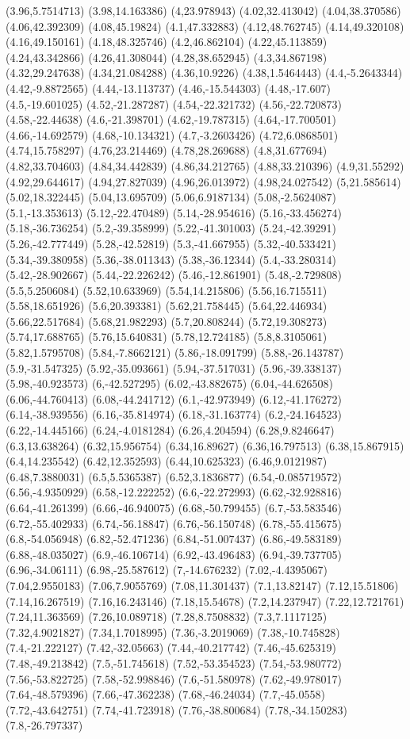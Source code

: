 (3.96,5.7514713) (3.98,14.163386) (4,23.978943) (4.02,32.413042) (4.04,38.370586) (4.06,42.392309) (4.08,45.19824) (4.1,47.332883) (4.12,48.762745) (4.14,49.320108) (4.16,49.150161) (4.18,48.325746) (4.2,46.862104) (4.22,45.113859) (4.24,43.342866) (4.26,41.308044) (4.28,38.652945) (4.3,34.867198) (4.32,29.247638) (4.34,21.084288) (4.36,10.9226) (4.38,1.5464443) (4.4,-5.2643344) (4.42,-9.8872565) (4.44,-13.113737) (4.46,-15.544303) (4.48,-17.607) (4.5,-19.601025) (4.52,-21.287287) (4.54,-22.321732) (4.56,-22.720873) (4.58,-22.44638) (4.6,-21.398701) (4.62,-19.787315) (4.64,-17.700501) (4.66,-14.692579) (4.68,-10.134321) (4.7,-3.2603426) (4.72,6.0868501) (4.74,15.758297) (4.76,23.214469) (4.78,28.269688) (4.8,31.677694) (4.82,33.704603) (4.84,34.442839) (4.86,34.212765) (4.88,33.210396) (4.9,31.55292) (4.92,29.644617) (4.94,27.827039) (4.96,26.013972) (4.98,24.027542) (5,21.585614) (5.02,18.322445) (5.04,13.695709) (5.06,6.9187134) (5.08,-2.5624087) (5.1,-13.353613) (5.12,-22.470489) (5.14,-28.954616) (5.16,-33.456274) (5.18,-36.736254) (5.2,-39.358999) (5.22,-41.301003) (5.24,-42.39291) (5.26,-42.777449) (5.28,-42.52819) (5.3,-41.667955) (5.32,-40.533421) (5.34,-39.380958) (5.36,-38.011343) (5.38,-36.12344) (5.4,-33.280314) (5.42,-28.902667) (5.44,-22.226242) (5.46,-12.861901) (5.48,-2.729808) (5.5,5.2506084) (5.52,10.633969) (5.54,14.215806) (5.56,16.715511) (5.58,18.651926) (5.6,20.393381) (5.62,21.758445) (5.64,22.446934) (5.66,22.517684) (5.68,21.982293) (5.7,20.808244) (5.72,19.308273) (5.74,17.688765) (5.76,15.640831) (5.78,12.724185) (5.8,8.3105061) (5.82,1.5795708) (5.84,-7.8662121) (5.86,-18.091799) (5.88,-26.143787) (5.9,-31.547325) (5.92,-35.093661) (5.94,-37.517031) (5.96,-39.338137) (5.98,-40.923573) (6,-42.527295) (6.02,-43.882675) (6.04,-44.626508) (6.06,-44.760413) (6.08,-44.241712) (6.1,-42.973949) (6.12,-41.176272) (6.14,-38.939556) (6.16,-35.814974) (6.18,-31.163774) (6.2,-24.164523) (6.22,-14.445166) (6.24,-4.0181284) (6.26,4.204594) (6.28,9.8246647) (6.3,13.638264) (6.32,15.956754) (6.34,16.89627) (6.36,16.797513) (6.38,15.867915) (6.4,14.235542) (6.42,12.352593) (6.44,10.625323) (6.46,9.0121987) (6.48,7.3880031) (6.5,5.5365387) (6.52,3.1836877) (6.54,-0.085719572) (6.56,-4.9350929) (6.58,-12.222252) (6.6,-22.272993) (6.62,-32.928816) (6.64,-41.261399) (6.66,-46.940075) (6.68,-50.799455) (6.7,-53.583546) (6.72,-55.402933) (6.74,-56.18847) (6.76,-56.150748) (6.78,-55.415675) (6.8,-54.056948) (6.82,-52.471236) (6.84,-51.007437) (6.86,-49.583189) (6.88,-48.035027) (6.9,-46.106714) (6.92,-43.496483) (6.94,-39.737705) (6.96,-34.06111) (6.98,-25.587612) (7,-14.676232) (7.02,-4.4395067) (7.04,2.9550183) (7.06,7.9055769) (7.08,11.301437) (7.1,13.82147) (7.12,15.51806) (7.14,16.267519) (7.16,16.243146) (7.18,15.54678) (7.2,14.237947) (7.22,12.721761) (7.24,11.363569) (7.26,10.089718) (7.28,8.7508832) (7.3,7.1117125) (7.32,4.9021827) (7.34,1.7018995) (7.36,-3.2019069) (7.38,-10.745828) (7.4,-21.222127) (7.42,-32.05663) (7.44,-40.217742) (7.46,-45.625319) (7.48,-49.213842) (7.5,-51.745618) (7.52,-53.354523) (7.54,-53.980772) (7.56,-53.822725) (7.58,-52.998846) (7.6,-51.580978) (7.62,-49.978017) (7.64,-48.579396) (7.66,-47.362238) (7.68,-46.24034) (7.7,-45.0558) (7.72,-43.642751) (7.74,-41.723918) (7.76,-38.800684) (7.78,-34.150283) (7.8,-26.797337) 